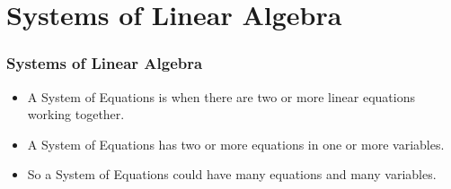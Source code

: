 \documentclass[a4paper,12pt]{beamer}
\begin{document}
\begin{frame}
\tableofcontents
\end{frame}

\section{Systems of Linear Algebra}
\begin{frame}
\frametitle{Systems of Linear Algebra}
\begin{itemize}
\item A System of Equations is when there are two or more linear equations working together.
\item A System of Equations has two or more equations in one or more variables.
\item So a System of Equations could have many equations and many variables.
\end{itemize}
\end{frame}
\end{document}
